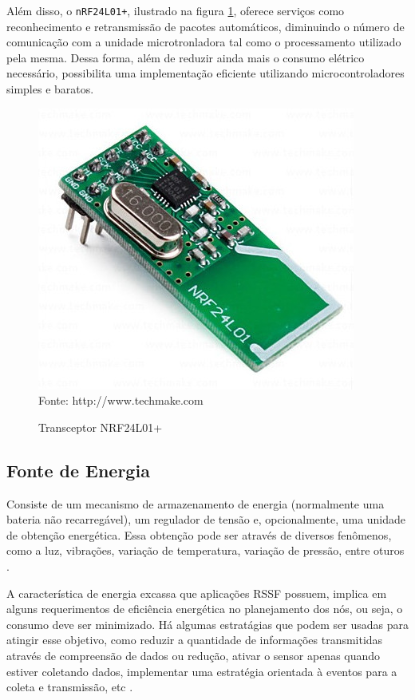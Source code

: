 Além disso, o \texttt{nRF24L01+}, ilustrado na figura \ref{figura:nrf}, oferece serviços como reconhecimento e
retransmissão de pacotes automáticos, diminuindo o número de comunicação com a unidade microtronladora tal
como o processamento utilizado pela mesma. Dessa forma, além de reduzir ainda mais o consumo elétrico
necessário, possibilita uma implementação eficiente utilizando microcontroladores simples e baratos.

\begin{figure}[h]
	\caption{Transceptor NRF24L01+}
	\centering
	\includegraphics[scale=0.25]{../images/nrf.jpg}
	\hspace{\linewidth}
	Fonte: http://www.techmake.com
	\label{figura:nrf}
\end{figure}

\subsection{Fonte de Energia}
Consiste de um mecanismo de armazenamento de energia (normalmente uma bateria não recarregável), um regulador
de tensão e, opcionalmente, uma unidade de obtenção energética. Essa obtenção pode ser através de diversos
fenômenos, como a luz, vibrações, variação de temperatura, variação de pressão, entre oturos
\cite{kuorilehto2007,karl_willig2005}.

A característica de energia excassa que aplicações RSSF possuem, implica em alguns requerimentos de eficiência
energética no planejamento dos nós, ou seja, o consumo deve ser minimizado. Há algumas estratágias que podem
ser usadas para atingir esse objetivo, como reduzir a quantidade de informações transmitidas através de
compreensão de dados ou redução, ativar o sensor apenas quando estiver coletando dados, implementar uma
estratégia orientada à eventos para a coleta e transmissão, etc \cite{kuorilehto2007,townsend_arms2005}.

